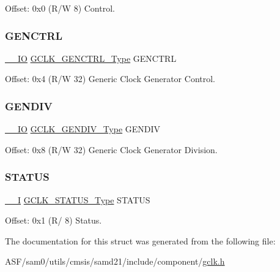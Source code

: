 Offset\+: 0x0 (R/W 8) Control. 

\mbox{\label{struct_gclk_aa25fe955229fab71288dcc86fe3e672b}} 
\subsubsection{\texorpdfstring{GENCTRL}{GENCTRL}}
{\footnotesize\ttfamily \mbox{\hyperlink{core__cm0plus_8h_aec43007d9998a0a0e01faede4133d6be}{\+\_\+\+\_\+\+IO}} \mbox{\hyperlink{union_g_c_l_k___g_e_n_c_t_r_l___type}{G\+C\+L\+K\+\_\+\+G\+E\+N\+C\+T\+R\+L\+\_\+\+Type}} G\+E\+N\+C\+T\+RL}



Offset\+: 0x4 (R/W 32) Generic Clock Generator Control. 

\mbox{\label{struct_gclk_aa48268a120aa8b1327323004b3248bdc}} 
\subsubsection{\texorpdfstring{GENDIV}{GENDIV}}
{\footnotesize\ttfamily \mbox{\hyperlink{core__cm0plus_8h_aec43007d9998a0a0e01faede4133d6be}{\+\_\+\+\_\+\+IO}} \mbox{\hyperlink{union_g_c_l_k___g_e_n_d_i_v___type}{G\+C\+L\+K\+\_\+\+G\+E\+N\+D\+I\+V\+\_\+\+Type}} G\+E\+N\+D\+IV}



Offset\+: 0x8 (R/W 32) Generic Clock Generator Division. 

\mbox{\label{struct_gclk_a3abd65232ccb4f986d0e884e31b37c6b}} 
\subsubsection{\texorpdfstring{STATUS}{STATUS}}
{\footnotesize\ttfamily \mbox{\hyperlink{core__cm0plus_8h_af63697ed9952cc71e1225efe205f6cd3}{\+\_\+\+\_\+I}} \mbox{\hyperlink{union_g_c_l_k___s_t_a_t_u_s___type}{G\+C\+L\+K\+\_\+\+S\+T\+A\+T\+U\+S\+\_\+\+Type}} S\+T\+A\+T\+US}



Offset\+: 0x1 (R/ 8) Status. 



The documentation for this struct was generated from the following file\+:\begin{DoxyCompactItemize}
\item 
A\+S\+F/sam0/utils/cmsis/samd21/include/component/\mbox{\hyperlink{utils_2cmsis_2samd21_2include_2component_2gclk_8h}{gclk.\+h}}\end{DoxyCompactItemize}
